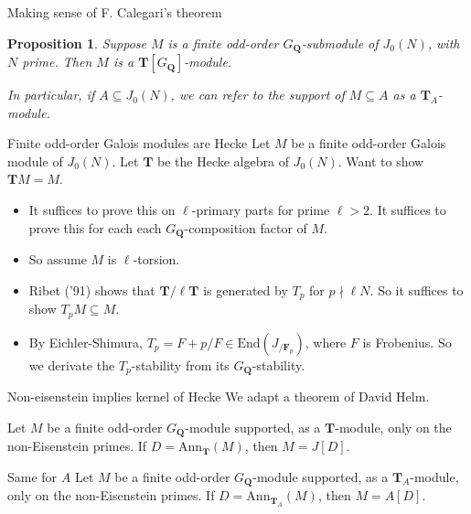 \documentclass{beamer}
\newtheorem{proposition}[theorem]{Proposition}
\newcommand{\QQ}{\mathbf{Q}}
\newcommand{\TT}{\mathbf{T}}
\newcommand{\F}{\mathbf{F}}
\newcommand{\Ann}{\mathrm{Ann}}
\newcommand{\End}{\mathrm{End}}
\begin{document}
\begin{frame}{Making sense of F. Calegari's theorem}
    \begin{proposition}
        Suppose $M$ is a finite odd-order $G_\QQ$-submodule of $J_0(N)$, with $N$
        prime. Then $M$ is a $\TT[G_\QQ]$-module.

        In particular, if $A\subseteq J_0(N)$, we can refer to the support of
        $M\subseteq A$ as a $\TT_A$-module.
    \end{proposition}
\end{frame}

\begin{frame}{Finite odd-order Galois modules are Hecke}
    Let $M$ be a finite odd-order Galois module of $J_0(N)$. Let $\TT$ be the
    Hecke algebra of $J_0(N)$. Want to show $\TT M = M$.
    \begin{itemize}
        \item
            It suffices to prove this on $\ell$-primary parts for prime
            $\ell>2$. It suffices to prove this for each each
            $G_\QQ$-composition factor of $M$.
            \pause
        \item
            So assume $M$ is $\ell$-torsion.
            \pause
        \item
            Ribet ('91) shows that $\TT/\ell \TT$ is generated by $T_p$ for
            $p\nmid \ell N$. So it suffices to show $T_p M \subseteq M$.
            \pause
        \item
            By Eichler-Shimura, $T_p = F+p/F\in \End(J_{/\F_p})$, where $F$ is
            Frobenius. So we derivate the $T_p$-stability from its
            $G_\QQ$-stability.
    \end{itemize}
\end{frame}

\begin{frame}{Non-eisenstein implies kernel of Hecke}
    We adapt a theorem of David Helm.
    \begin{theorem}[D. Helm]
        Let $M$ be a finite odd-order $G_\QQ$-module supported, as a $\TT$-module,
        only on the non-Eisenstein primes. If $D=\Ann_\TT(M)$, then $M=J[D]$.
    \end{theorem}
            \pause
\begin{block}{Same for $A$}
    Let $M$ be a finite odd-order $G_\QQ$-module supported, as a $\TT_A$-module,
    only on the non-Eisenstein primes. If $D=\Ann_{\TT_A}(M)$, then $M=A[D]$.
\end{block}

\end{frame}
\end{document}
